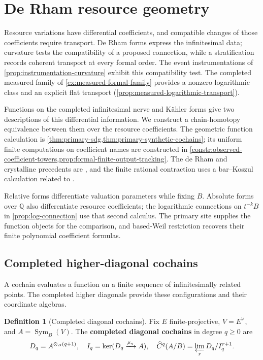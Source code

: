 \documentclass[11pt,a4paper]{article}
\numberwithin{algorithm}{section}
\numberwithin{equation}{section}
\theoremstyle{definition}
\newtheorem{definition}[definition]{Definition}
\theoremstyle{remark}
\theoremstyle{plain}
\newcommand{\QQ}{\mathbb Q}
\newcommand{\Sym}{\operatorname{Sym}}
\theoremstyle{definition}
\theoremstyle{plain}
\begin{document}
\section{De Rham resource geometry}
\label{sec:derham}

Resource variations have differential coefficients, and compatible
changes of those coefficients require transport. De Rham forms express
the infinitesimal data; curvature tests the compatibility of a proposed
connection, while a stratification records coherent transport at every
formal order. The event instrumentations of
\cref{prop:instrumentation-curvature} exhibit this compatibility test.
The completed measured family of \cref{ex:measured-formal-family}
provides a nonzero logarithmic class and an explicit flat transport
(\cref{prop:measured-logarithmic-transport}).

Functions on the completed infinitesimal nerve and K\"ahler
forms give two descriptions of this differential information. We
construct a chain-homotopy equivalence between them over the
resource coefficients. The geometric function calculation is
\cref{thm:primary-sdg,thm:primary-synthetic-cochains}; its uniform
finite computations on coefficient names are constructed in
\cref{constr:observed-coefficient-towers,prop:formal-finite-output-tracking}.
The de Rham and crystalline precedents are
\citep{GrothendieckDeRham,BerthelotOgus}, and the finite rational
contraction uses a bar--Koszul calculation related to \citep{HKR}.

Relative forms differentiate valuation parameters while fixing $B$.
Absolute forms over $\QQ$ also differentiate resource coefficients;
the logarithmic connections on $t^{-k}B$ in \cref{prop:log-connection}
use that second calculus. The primary site supplies the function
objects for the comparison, and based-Weil restriction recovers their
finite polynomial coefficient formulas.

\subsection{Completed higher-diagonal cochains}
\label{sec:completed-cochains}
A cochain evaluates a function on a finite sequence of
infinitesimally related points. The completed higher diagonals
provide these configurations and their coordinate algebras.


\begin{definition}[Completed diagonal cochains]\label{def:completed-cochains}
Fix $E$ finite-projective, $V=E^\vee$, and $A=\Sym_B(V)$.
The \textbf{completed diagonal cochains} in degree $q\ge0$ are
\[
 D_q=A^{\otimes_B(q+1)},\quad
 I_q=\ker(D_q\xrightarrow{\mu_q}A),\quad
 \widehat C^q(A/B)=\varprojlim_rD_q/I_q^{r+1}.
\]
\end{definition}
\end{document}
